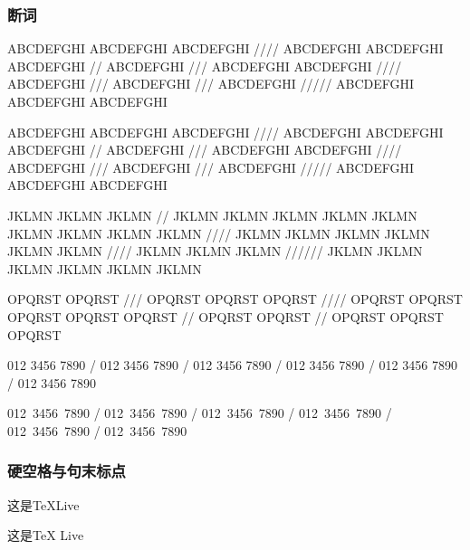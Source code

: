 \documentclass{ctexart}
\begin{document}
        \subsubsection{断词}
            ABCDEFGHI ABCDEFGHI ABCDEFGHI //// ABCDEFGHI ABCDEFGHI ABCDEFGHI // ABCDEFGHI /// ABCDEFGHI ABCDEFGHI //// ABCDEFGHI /// ABCDEFGHI /// ABCDEFGHI ///// ABCDEFGHI ABCDEFGHI ABCDEFGHI

            ABCDEFGHI ABCDEFGHI ABCDEFGHI //// ABCDEFGHI ABCDEFGHI ABCDEFGHI // ABCDEFGHI /// ABCDEFGHI ABCDEFGHI //// ABCDEFGHI /// ABCDEFGHI /// ABCDEFGHI ///// ABCDEFGHI ABCDEFGHI ABCDEFGHI

            JKLMN JKLMN JKLMN // JKLMN JKLMN JKLMN JKLMN JKLMN JKLMN JKLMN JKLMN JKLMN //// JKLMN JKLMN JKLMN JKLMN JKLMN JKLMN //// JKLMN JKLMN JKLMN ////// JKLMN JKLMN JKLMN JKLMN JKLMN JKLMN

            OP\-QRS\-T OP\-QRS\-T /// OP\-QRS\-T OP\-QRS\-T OP\-QRS\-T //// OP\-QRS\-T OP\-QRS\-T OP\-QRS\-T OP\-QRS\-T OP\-QRS\-T // OP\-QRS\-T OP\-QRS\-T // OP\-QRS\-T OP\-QRS\-T OP\-QRS\-T 
         
            012 3456 7890 / 012 3456 7890 / 012 3456 7890 / 012 3456 7890 / 012 3456 7890 / 012 3456 7890

            \mbox{012 3456 7890} / \mbox{012 3456 7890} / \mbox{012 3456 7890} / \mbox{012 3456 7890} / \mbox{012 3456 7890} / \mbox{012 3456 7890}

        \subsubsection{硬空格与句末标点}
            这是\TeX Live %

            这是\TeX{} Live %
\end{document}
